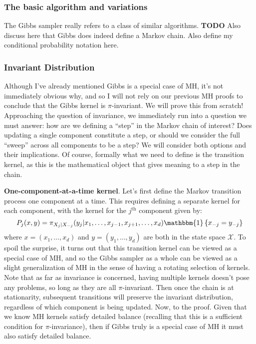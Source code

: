 \documentclass[12pt]{article}
\begin{document}
\subsubsection{The basic algorithm and variations}
The Gibbs sampler really refers to a class of similar algorithms. \textbf{TODO}
Also discuss here that Gibbs does indeed define a Markov chain. Also define my conditional probability notation here. 

\subsubsection{Invariant Distribution}
Although I've already mentioned Gibbs is a special case of MH, it's not immediately obvious why, and so I will not rely on our previous MH proofs to conclude that the Gibbs kernel is $\pi$-invariant. 
We will prove this from scratch! Approaching the question of invariance, we immediately run into a question we must answer: how are we defining a ``step'' in the Markov chain of interest? Does 
updating a single component constitute a step, or should we consider the full ``sweep'' across all components to be a step? We will consider both options and their implications. Of course, formally what 
we need to define is the transition kernel, as this is the mathematical object that gives meaning to a step in the chain. 

\bigskip

\textbf{One-component-at-a-time kernel}. Let's first define the Markov transition process one component at a time. This requires defining a separate kernel for each component, with the kernel for 
the $j^{\text{th}}$ component given by: 
\[P_j(x, y) = \pi_{X_j|X_{-j}}(y_j|x_1, \dots, x_{j - 1}, x_{j + 1}, \dots, x_d)\mathbbm{1}\left\{x_{-j} = y_{-j}\right\}\]
where $x = (x_1, \dots, x_d)$ and $y = (y_1, \dots, y_d)$ are both in the state space $\mathcal{X}$. To spoil the surprise, it turns out that this transition kernel can be viewed as a special case 
of MH, and so the Gibbs sampler as a whole can be viewed as a slight generalization of MH in the sense of having a rotating selection of kernels. Note that as far as invariance is concerned, 
having multiple kernels doesn't pose any problems, so long as they are all $\pi$-invariant. Then once the chain is at stationarity, subsequent transitions will preserve the invariant distribution, regardless
of which component is being updated. Now, to the proof. Given that we know MH kernels satisfy detailed balance (recalling that this is a sufficient condition for $\pi$-invariance), then if Gibbs truly is a special
case of MH it must also satisfy detailed balance. 
\end{document}
